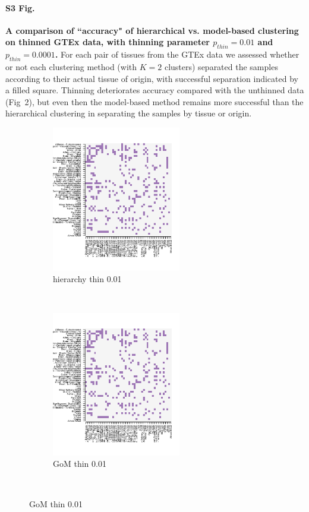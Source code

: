 \documentclass[10pt,letterpaper]{article}
\begin{document}
\paragraph*{S3 Fig.}
\label{figS2}
{\bf A comparison of ``accuracy" of hierarchical vs. model-based clustering on thinned GTEx data, with thinning parameter $p_{thin}=0.01$ and $p_{thin}=0.0001$.}  For each pair of tissues from the GTEx data we assessed whether or not each clustering method (with $K=2$ clusters) separated the samples according to their actual tissue of origin, with successful separation indicated by a filled square. Thinning deteriorates accuracy compared with the unthinned data (Fig~2), but even then the model-based method remains more successful than the hierarchical clustering in separating the samples by tissue or origin.
 \begin{figure}[ht]
    \centering
     \begin{subfigure}[t]{0.5\textwidth}
        \centering
        \includegraphics[height=2.5in]{../../plots/rsz_1hierarchy_F_thin_0_01.png}
        \caption{hierarchy thin 0.01}
    \end{subfigure}%
    ~
    \begin{subfigure}[t]{0.5\textwidth}
        \centering
        \includegraphics[height=2.5in]{../../plots/rsz_1hierarchy_F_thin_0_01.png}
        \caption{GoM thin 0.01}
    \end{subfigure}\\


\end{figure}
\end{document}
